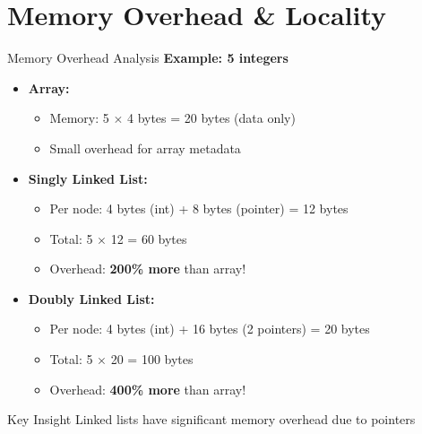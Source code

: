 \documentclass[aspectratio=169,xcolor=dvipsnames]{beamer}
\begin{document}
\section{Memory Overhead \& Locality}

\begin{frame}{Memory Overhead Analysis}
  \textbf{Example: 5 integers}

  \vspace{0.3cm}
  \begin{itemize}
    \item \textbf{Array:}
    \begin{itemize}
      \item Memory: 5 $\times$ 4 bytes = 20 bytes (data only)
      \item Small overhead for array metadata
    \end{itemize}

    \vspace{0.2cm}
    \item \textbf{Singly Linked List:}
    \begin{itemize}
      \item Per node: 4 bytes (int) + 8 bytes (pointer) = 12 bytes
      \item Total: 5 $\times$ 12 = 60 bytes
      \item Overhead: \textbf{200\% more} than array!
    \end{itemize}

    \vspace{0.2cm}
    \item \textbf{Doubly Linked List:}
    \begin{itemize}
      \item Per node: 4 bytes (int) + 16 bytes (2 pointers) = 20 bytes
      \item Total: 5 $\times$ 20 = 100 bytes
      \item Overhead: \textbf{400\% more} than array!
    \end{itemize}
  \end{itemize}

  \vspace{0.3cm}
  \begin{alertblock}{Key Insight}
    Linked lists have significant memory overhead due to pointers
  \end{alertblock}
\end{frame}
\end{document}
